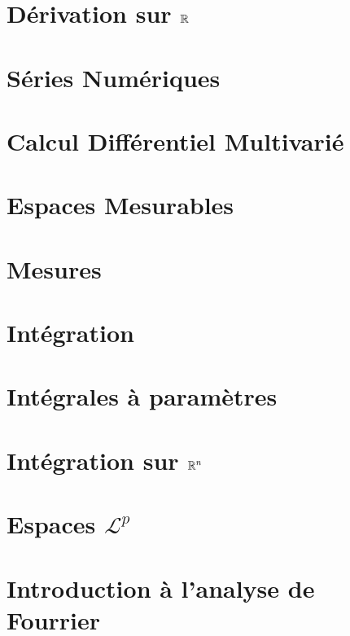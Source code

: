 


\chapter{Dérivation sur $\mathbb{R}$}


\chapter{Séries Numériques}


\chapter{Calcul Différentiel Multivarié}


\chapter{Espaces Mesurables}


\chapter{Mesures}


\chapter{Intégration}


\chapter{Intégrales à paramètres}


\chapter{Intégration sur $\mathbb{R}^n$}


\chapter{Espaces $ \mathcal{L}^p$}


\chapter{Introduction à l'analyse de Fourrier}



